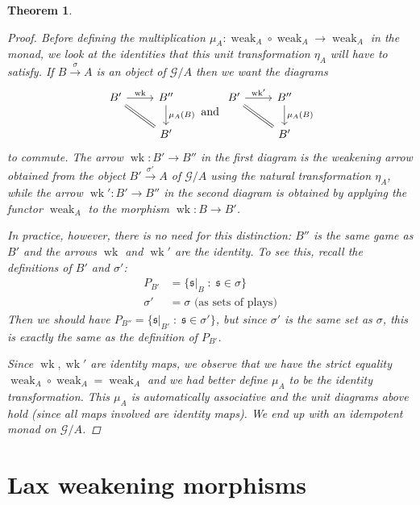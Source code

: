 \documentclass[11pt]{article} %
\theoremstyle{plain} %
\newtheorem{theorem}{Theorem}[section]
\theoremstyle{definition} %
\theoremstyle{exercisestyle}
\newcommand{\map}[3]{#2\xrightarrow{#1} #3}
\newcommand*\from{\colon}
\newcommand{\cmap}[3]{#1\from{}#2\to{}#3}
\newcommand{\comp}[2]{#1 \circ #2}
\newcommand{\G}{\mathcal G}
\newcommand{\suchthat}{\;\colon\;}
\DeclareMathOperator{\wk}{wk}
\DeclareMathOperator{\weak}{weak}
\newcommand{\s}{\mathfrak{s}}
\begin{document}
\begin{theorem}
\begin{proof}
   Before defining the multiplication $\cmap{\mu_A}{\comp{\weak_A}{\weak_A}}{\weak_A}$ in the monad, we look at the identities that this unit transformation $\eta_A$ will have to satisfy.  If $\map{\sigma}{B}{A}$ is an object of $\G/A$ then we want the diagrams
   \[
     \begin{tikzcd}
       B' \arrow[r, "\wk"] \arrow[dr, equals]
         & B'' \arrow[d, "\mu_A(B)"] \\
         & B'
     \end{tikzcd}
     \textrm{ and }
     \begin{tikzcd}
       B' \arrow[r, "\wk'"] \arrow[dr, equals]
         & B'' \arrow[d, "\mu_A(B)"] \\
         & B'
     \end{tikzcd}
     \]
   to commute.  The arrow $\cmap{\wk}{B'}{B''}$ in the first diagram is the weakening arrow obtained from the object $\map{\sigma'}{B'}{A}$ of $\G/A$ using the natural transformation $\eta_A$, while the arrow $\cmap{\wk'}{B'}{B''}$ in the second diagram is obtained by applying the functor $\weak_A$ to the morphism $\cmap{\wk}{B}{B'}$.  

   In practice, however, there is no need for this distinction: $B''$ is the same game as $B'$ and the arrows $\wk$ and $\wk'$ are the identity.  To see this, recall the definitions of $B'$ and $\sigma'$:
   \begin{align*}
     P_{B'} & = \{\s\vert_B\suchthat \s\in\sigma\} \\
     \sigma' & = \sigma\textrm{ (as sets of plays)}
   \end{align*}
   Then we should have $P_{B''} = \{\s\vert_{B'}\suchthat \s\in\sigma'\}$, but since $\sigma'$ is the same set as $\sigma$, this is exactly the same as the definition of $P_{B'}$.  

   Since $\wk,\wk'$ are identity maps, we observe that we have the strict equality $\comp{\weak_A}{\weak_A}=\weak_A$ and we had better define $\mu_A$ to be the identity transformation.  This $\mu_A$ is automatically associative and the unit diagrams above hold (since all maps involved are identity maps).  We end up with an idempotent monad on $\G/A$.
  \end{proof}
\end{theorem}

\section{Lax weakening morphisms}
\end{document}

